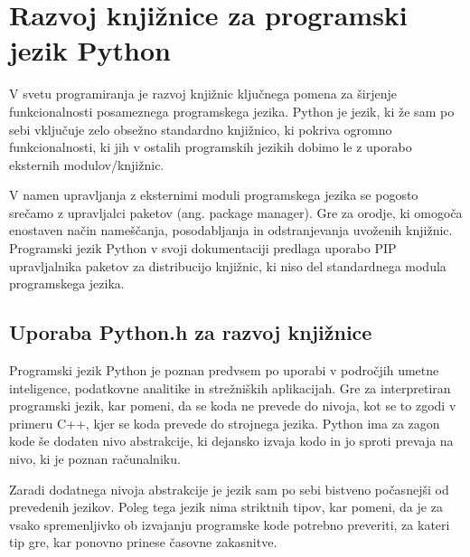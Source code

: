 \documentclass[a4paper,12pt,openright]{book}
\begin{document}
    \section{Razvoj knjižnice za programski jezik \newline Python}

    V svetu programiranja je razvoj knjižnic ključnega pomena za širjenje funkcionalnosti posameznega programskega jezika. Python je jezik, ki že sam po sebi vključuje zelo obsežno standardno knjižnico, ki pokriva ogromno funkcionalnosti, ki jih v ostalih programskih jezikih dobimo le z uporabo eksternih modulov/knjižnic.

    V namen upravljanja z eksternimi moduli programskega jezika se pogosto srečamo z upravljalci paketov (ang. package manager). Gre za orodje, ki omogoča enostaven način nameščanja, posodabljanja in odstranjevanja uvoženih knjižnic. Programski jezik Python v svoji dokumentaciji \cite{PY_PM} predlaga uporabo PIP \cite{PIP} upravljalnika paketov za distribucijo knjižnic, ki niso del standardnega modula programskega jezika.
   
    \subsection{Uporaba Python.h za razvoj knjižnice}
   Programski jezik Python je poznan predvsem po uporabi v področjih umetne inteligence, podatkovne analitike in strežniških aplikacijah. Gre za interpretiran programski jezik, kar pomeni, da se koda ne prevede do nivoja, kot se to zgodi v primeru C++, kjer se koda prevede do strojnega jezika. Python ima za zagon kode še dodaten nivo abstrakcije, ki dejansko izvaja kodo in jo sproti prevaja na nivo, ki je poznan računalniku.

   Zaradi dodatnega nivoja abstrakcije je jezik sam po sebi bistveno počasnejši od prevedenih jezikov. Poleg tega jezik nima striktnih tipov, kar pomeni, da je za vsako spremenljivko ob izvajanju programske kode potrebno preveriti, za kateri tip gre, kar ponovno prinese časovne zakasnitve.
\end{document}

